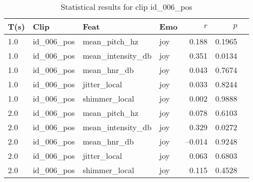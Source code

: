 \begin{table}[ht]

       \centering

  \begin{tabular}{l l l l r r l}
    \toprule
    T(s) & Clip           & Feat             & Emo & $r$ & $p$ \\
    \midrule
    1.0  & id\_006\_pos   & mean\_pitch\_hz       & joy     & 0.188      & 0.1965          \\
    1.0  & id\_006\_pos   & mean\_intensity\_db   & joy     & 0.351      & 0.0134            \\
    1.0  & id\_006\_pos   & mean\_hnr\_db         & joy     & 0.043      & 0.7674           \\
    1.0  & id\_006\_pos   & jitter\_local         & joy     & 0.033      & 0.8244          \\
    1.0  & id\_006\_pos   & shimmer\_local        & joy     & 0.002      & 0.9888          \\
    2.0  & id\_006\_pos   & mean\_pitch\_hz     & joy     &  0.078 & 0.6103  \\
    2.0  & id\_006\_pos   & mean\_intensity\_db & joy     &  0.329 & 0.0272   \\
    2.0  & id\_006\_pos   & mean\_hnr\_db       & joy     & –0.014 & 0.9248  \\
    2.0  & id\_006\_pos   & jitter\_local       & joy     &  0.063 & 0.6803  \\
    2.0  & id\_006\_pos   & shimmer\_local      & joy     &  0.115 & 0.4528  \\
    \bottomrule
  \end{tabular}
  \caption{Statistical results for clip id\_006\_pos}
    \label{tab:clip006_pos_stats}
    \end{table}
  
